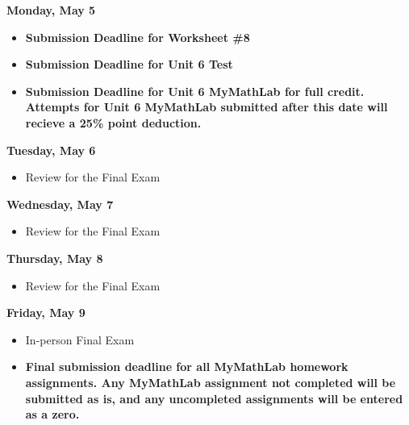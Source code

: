 \documentclass[11pt]{article}
\begin{document}
\textbf{Monday, May 5}

\begin{itemize}
\item \textbf{Submission Deadline for Worksheet \#8}
\item \textbf{Submission Deadline for Unit 6 Test}
\item \textbf{Submission Deadline for Unit 6 MyMathLab for full credit. Attempts for Unit 6 MyMathLab submitted after this date will recieve a 25\% point deduction.}
\end{itemize}

\textbf{Tuesday, May 6}

\begin{itemize}
\item Review for the Final Exam
\end{itemize}

\textbf{Wednesday, May 7}

\begin{itemize}
\item Review for the Final Exam
\end{itemize}

\textbf{Thursday, May 8}

\begin{itemize}
\item Review for the Final Exam
\end{itemize}

\textbf{Friday, May 9}

\begin{itemize}
\item In-person Final Exam
\item \textbf{Final submission deadline for all MyMathLab homework assignments. Any MyMathLab assignment not completed will be submitted as is, and any uncompleted assignments will be entered as a zero.}
\end{itemize}
\end{document}
